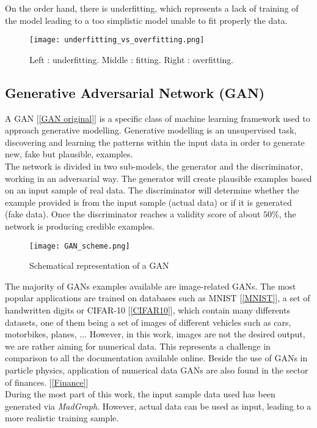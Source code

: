 \documentclass [12pt] {article}
\numberwithin{equation}{section} %
\numberwithin{figure}{section}   %
\begin{document}
On the order hand, there is underfitting, which represents a lack of training of the model leading to a too simplistic model unable to fit properly the data.

\begin{figure}[H]
    \centering
    \texttt{[image: underfitting\_vs\_overfitting.png]}
    \caption{Left : underfitting. Middle : fitting. Right : overfitting.}
    \label{overfit}
\end{figure}

\subsection{Generative Adversarial Network (GAN)}

A GAN [\ref{GAN original}] is a specific class of machine learning framework used to approach generative modelling. Generative modelling is an unsupervised task, discovering and learning the patterns within the input data in order to generate new, fake but plausible, examples.\\
The network is divided in two sub-models, the generator and the discriminator, working in an adversarial way. The generator will create plausible examples based on an input sample of real data. The discriminator will determine whether the example provided is from the input sample (actual data) or if it is generated (fake data). Once the discriminator reaches a validity score of about $50\%$, the network is producing credible examples.

\begin{figure}[H]
    \centering
    \texttt{[image: GAN\_scheme.png]}
    \caption{Schematical representation of a GAN}
\end{figure}

The majority of GANs examples available are image-related GANs. The most popular applications are trained on databases such as MNIST [\ref{MNIST}], a set of handwritten digits or CIFAR-10 [\ref{CIFAR10}], which contain many differents datasets, one of them being a set of images of different vehicles such as cars, motorbikes, planes, ... However, in this work, images are not the desired output, we are rather aiming for numerical data. This represents a challenge in comparison to all the documentation available online. Beside the use of GANs in particle physics, application of numerical data GANs are also found in the sector of finances. [\ref{Finance}]\\
During the most part of this work, the input sample data used has been generated via \textit{MadGraph}. However, actual data can be used as input, leading to a more realistic training sample.\\
\end{document}
